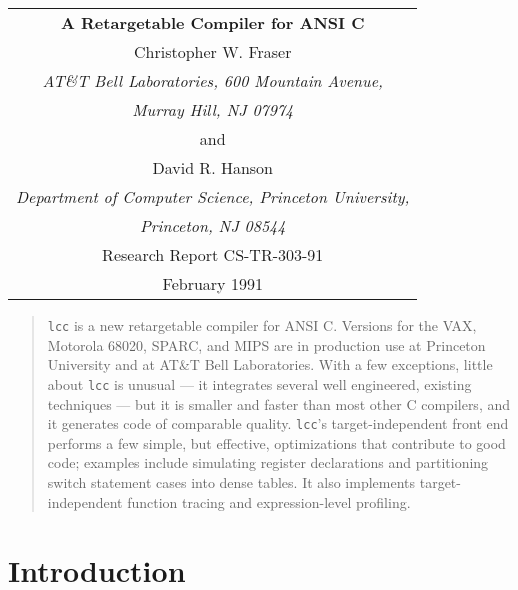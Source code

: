 
\begin{titlepage}
\normalsize
\vspace*{.7in}
\begin{center}
\begin{tabular}{c}
\bf\Large A Retargetable Compiler for ANSI C \\[.5in]

Christopher W. Fraser \\
\em AT\&T Bell Laboratories, 600 Mountain Avenue, \\
\em Murray Hill, NJ 07974 \\[1ex]
and \\[1ex]
David R. Hanson \\
\em Department of Computer Science, Princeton University, \\
\em Princeton, NJ 08544 \\[.7in]

Research Report CS-TR-303-91 \\[1ex]
February 1991 \\[.5in]

\end{tabular}
\end{center}

\begin{abstract}
\normalsize
\verb|lcc| is a new retargetable compiler for ANSI C.
Versions for the VAX, Motorola 68020, SPARC, and MIPS
are in production use at Princeton University
and at AT\&T Bell Laboratories.
With a few exceptions,
little about \verb|lcc| is unusual --- it integrates
several well engineered, existing techniques ---
but it is smaller and faster than most other C compilers,
and it generates code of comparable quality.
\verb|lcc|'s target-independent front end performs a
few simple, but effective, optimizations that contribute
to good code; examples include simulating register declarations
and partitioning switch statement cases into dense tables.
It also implements target-independent function tracing
and expression-level profiling.
\end{abstract}

\end{titlepage}




\setcounter{secnumdepth}{0}

\section{Introduction}

